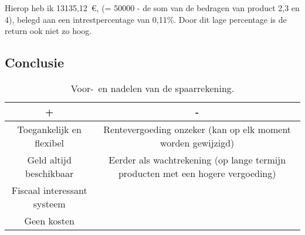 Hierop heb ik 13135,12~\euro{}, (= 50000 - de som van de bedragen van product 2,3 en 4), belegd aan een intrestpercentage van 0,11\%. Door dit lage percentage is de return ook niet zo hoog.




\subsection{Conclusie}


\begin{table}[!htbp]
	\centering
		\begin{tabular}{c|c}
			\toprule
			
			 \cellcolor{lightgray}            +              &  \cellcolor{lightgray}                                      -                                        \\ \midrule
			 Toegankelijk en flexibel   &          Rentevergoeding onzeker (kan op elk moment worden  gewijzigd)          \\ \hline
			  Geld altijd beschikbaar   & Eerder als wachtrekening (op lange termijn producten met een hogere vergoeding) \\ \hline
			Fiscaal interessant systeem &  \\ \hline
			        Geen kosten         &  \\ \bottomrule
		\end{tabular}
	\caption{Voor-~en nadelen van de spaarrekening.}
	\label{tab:voordelenennadelenspaarrekening}
\end{table}



